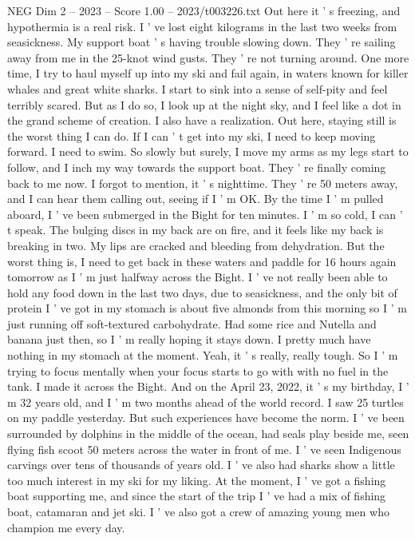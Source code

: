 \begin{textsample}{NEG Dim 2 – 2023 – Score 1.00 – 2023/t003226.txt}
Out here it ' s freezing, and hypothermia is a real risk.
I ' ve lost eight kilograms in the last two weeks from seasickness.
My support boat ' s having trouble slowing down.
They ' re sailing away from me in the 25-knot wind gusts.
They ' re not turning around.
One more time, I try to haul myself up into my ski and fail again, in waters known for killer whales and great white sharks.
I start to sink into a sense of self-pity and feel terribly scared.
But as I do so, I look up at the night sky, and I feel like a dot in the grand scheme of creation.
I also have a realization.
Out here, staying still is the worst thing I can do.
If I can ' t get into my ski, I need to keep moving forward.
I need to swim.
So slowly but surely, I move my arms as my legs start to follow, and I inch my way towards the support boat.
They ' re finally coming back to me now.
I forgot to mention, it ' s nighttime.
They ' re 50 meters away, and I can hear them calling out, seeing if I ' m OK.
By the time I ' m pulled aboard, I ' ve been submerged in the Bight for ten minutes.
I ' m so cold, I can ' t speak.
The bulging discs in my back are on fire, and it feels like my back is breaking in two.
My lips are cracked and bleeding from dehydration.
But the worst thing is, I need to get back in these waters and paddle for 16 hours again tomorrow as I ' m just halfway across the Bight.
I ' ve not really been able to hold any food down in the last two days, due to seasickness, and the only bit of protein I ' ve got in my stomach is about five almonds from this morning so I ' m just running off soft-textured carbohydrate.
Had some rice and Nutella and banana just then, so I ' m really hoping it stays down.
I pretty much have nothing in my stomach at the moment.
Yeah, it ' s really, really tough.
So I ' m trying to focus mentally when your focus starts to go with with no fuel in the tank.
I made it across the Bight.
And on the April 23, 2022, it ' s my birthday, I ' m 32 years old, and I ' m two months ahead of the world record.
I saw 25 turtles on my paddle yesterday.
But such experiences have become the norm.
I ' ve been surrounded by dolphins in the middle of the ocean, had seals play beside me, seen flying fish scoot 50 meters across the water in front of me.
I ' ve seen Indigenous carvings over tens of thousands of years old.
I ' ve also had sharks show a little too much interest in my ski for my liking.
At the moment, I ' ve got a fishing boat supporting me, and since the start of the trip I ' ve had a mix of fishing boat, catamaran and jet ski.
I ' ve also got a crew of amazing young men who champion me every day.

\end{textsample}
